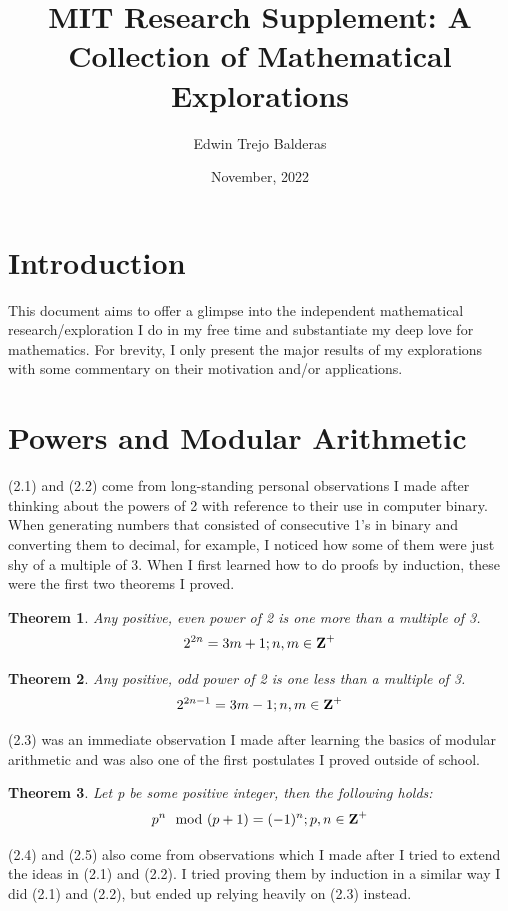 \documentclass{article}
\title{MIT Research Supplement: A Collection of Mathematical Explorations}
\author{Edwin Trejo Balderas}
\date{November, 2022}
\newtheorem{theorem}{Theorem}[section]
\begin{document}
\maketitle

\section{Introduction}
This document aims to offer a glimpse into the independent mathematical research/exploration I do in my free time and substantiate my deep love for mathematics. For brevity, I only present the major results of my explorations with some commentary on their motivation and/or applications.

\section{Powers and Modular Arithmetic}

(2.1) and (2.2) come from long-standing personal observations I made after thinking about the powers of 2 with reference to their use in computer binary. When generating numbers that consisted of consecutive 1's in binary and converting them to decimal, for example, I noticed how some of them were just shy of a multiple of 3. When I first learned how to do proofs by induction, these were the first two theorems I proved.

\begin{theorem}
    Any positive, even power of 2 is one more than a multiple of 3. 
    $$2^{2n}=3m+1;n,m\in\mbox{\textbf{Z}}^+$$
\end{theorem}

\begin{theorem}
    Any positive, odd power of 2 is one less than a multiple of 3. 
    $$2^{2n-1}=3m-1;n,m\in\mbox{\textbf{Z}}^+$$
\end{theorem}

(2.3) was an immediate observation I made after learning the basics of modular arithmetic and was also one of the first postulates I proved outside of school.

\begin{theorem}
    Let \mbox{p} be some positive integer, then the following holds:
    $$p^n\mod{(p+1)}=(-1)^n;p,n\in\mbox{\textbf{Z}}^+$$
\end{theorem}

(2.4) and (2.5) also come from observations which I made after I tried to extend the ideas in (2.1) and (2.2). I tried proving them by induction in a similar way I did (2.1) and (2.2), but ended up relying heavily on (2.3) instead.
\end{document}
